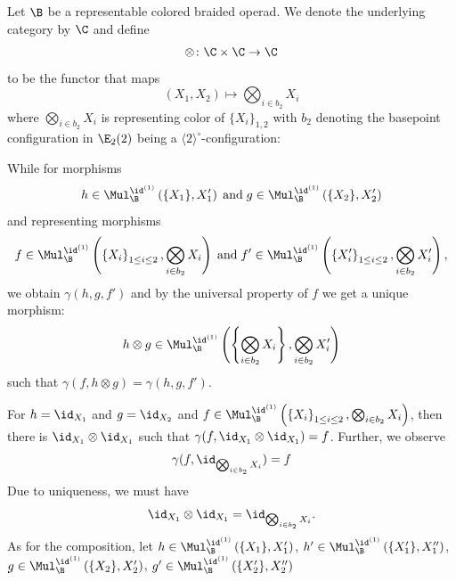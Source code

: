 \begin{const}\label{con:braidmon} Let $\B$ be a representable colored braided
    operad. We denote the underlying category by $\C$ and define
    \[
        \otimes \colon \C \times \C \to \C
    \]
    to be the functor that maps
    \[
        (X_1,X_2) \mapsto \bigotimes_{i \in b_2} X_i
    \]
    where  $\bigotimes_{i \in b_2} X_i$ is representing color of $\{X_i\}_{1,2}$
    with $b_2$ denoting the basepoint configuration in $\E_2(2)$ being a
    $\langle 2 \rangle^{\circ}$-configuration:
    
    \begin{center}
    \end{center}

    While for morphisms
    \[
        h \in \Mul_{\B}^{\id^{(1)}}\left(\{X_1\}, X_1'\right) \; \text{and} \;  g \in \Mul_{\B}^{\id^{(1)}}\left(\{X_2\}, X_2'\right)
    \] 
    and representing morphisms 
    \[
    f \in \Mul_{\B}^{\id^{(1)}}\left(\left\{X_i\right\}_{1 \leq
    i \leq 2}, \bigotimes_{i \in b_2} X_i\right) \; \text{and} \; f' \in
    \Mul_{\B}^{\id^{(1)}}\left(\left\{X_i'\right\}_{1 \leq i \leq 2},
    \bigotimes_{i \in b_2} X_i'\right),
    \]
    we obtain $\gamma(h,g,f')$ and by the universal property of $f$ we get a
    unique morphism:
    \[
        h \otimes g \in \Mul_{\B}^{\id^{(1)}}\left(\left\{\bigotimes_{i \in b_2} X_i\right\}, \bigotimes_{i \in b_2} X_i'\right)
    \]
    such that $\gamma(f, h \otimes g) = \gamma(h,g,f')$. 
    

    For $h = \id_{X_1}$ and $g=\id_{X_2}$ and $f \in
    \Mul_{\B}^{\id^{(1)}}\left(\left\{X_i\right\}_{1 \leq i \leq 2},
    \bigotimes_{i \in b_2} X_i\right)$, then there is $\id_{X_1} \otimes
    \id_{X_1}$ such that $\gamma(f, \id_{X_1} \otimes \id_{X_1}) = f$. Further,
    we observe
    \[
        \gamma(f,\id_{\bigotimes_{i \in b_2} X_i}) = f
    \]
    Due to uniqueness, we must have
    \[
        \id_{X_1} \otimes \id_{X_1} = \id_{\bigotimes_{i \in b_2} X_i}.
    \]
    As for the composition, let $h \in \Mul_{\B}^{\id^{(1)}}\left(\{X_1\},
    X_1'\right)$, $h' \in \Mul_{\B}^{\id^{(1)}}\left(\{X_1'\}, X_1''\right)$, $g
    \in \Mul_{\B}^{\id^{(1)}}\left(\{X_2\}, X_2'\right)$, $g' \in
    \Mul_{\B}^{\id^{(1)}}\left(\{X_2'\}, X_2''\right)$


\end{const}
